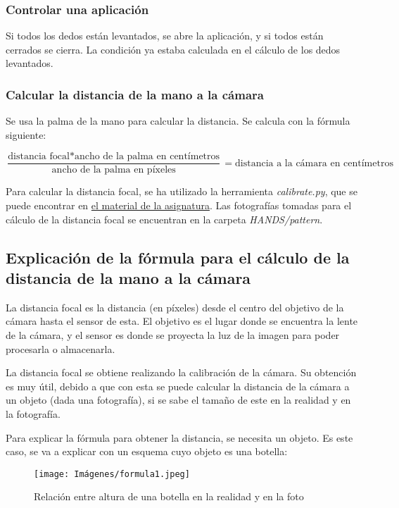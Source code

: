 \documentclass[12pt]{article}
\begin{document}
\subsubsection*{Controlar una aplicación}

Si todos los dedos están levantados, se abre la aplicación, y si todos están cerrados se cierra. La condición ya estaba calculada en el cálculo de los dedos levantados.

\subsubsection*{Calcular la distancia de la mano a la cámara}

Se usa la palma de la mano para calcular la distancia. Se calcula con la fórmula siguiente:

$$\frac{\text{distancia focal} * \text{ancho de la palma en centímetros}}{\text{ancho de la palma en píxeles}} = \text{distancia a la cámara en centímetros}$$

Para calcular la distancia focal, se ha utilizado la herramienta \textit{calibrate.py}, que se puede encontrar en \href{https://github.com/albertoruiz/umucv/tree/master/code/calibrate}{el material de la asignatura}. Las fotografías tomadas para el cálculo de la distancia focal se encuentran en la carpeta \textit{HANDS/pattern}.

\subsection*{Explicación de la fórmula para el cálculo de la distancia de la mano a la cámara}

La distancia focal es la distancia (en píxeles) desde el centro del objetivo de la cámara hasta el sensor de esta. El objetivo es el lugar donde se encuentra la lente de la cámara, y el sensor es donde se proyecta la luz de la imagen para poder procesarla o almacenarla.

La distancia focal se obtiene realizando la calibración de la cámara. Su obtención es muy útil, debido a que con esta se puede calcular la distancia de la cámara a un objeto (dada una fotografía), si se sabe el tamaño de este en la realidad y en la fotografía.

Para explicar la fórmula para obtener la distancia, se necesita un objeto. Es este caso, se va a explicar con un esquema cuyo objeto es una botella:

\begin{figure}[H]
    \centering
    \texttt{[image: Imágenes/formula1.jpeg]}
    \caption{Relación entre altura de una botella en la realidad y en la foto}
    \label{fig:semana2Botella}
\end{figure}
\end{document}
